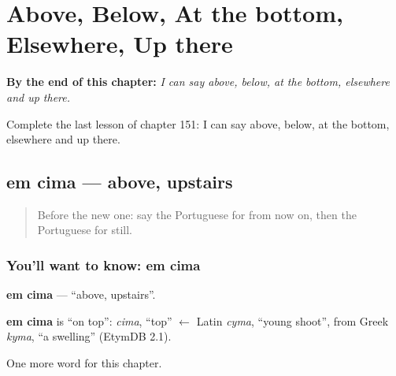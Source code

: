 
\chapter{Above, Below, At the bottom, Elsewhere, Up there}
\label{ch:pt-above-below-at-the-bottom-elsewhere-up-there}

\begin{chapteropening}
\textbf{By the end of this chapter:} \emph{I can say above, below, at the bottom, elsewhere and up there.}

Complete the last lesson of chapter 151: I can say above, below, at the bottom, elsewhere and up there.
\end{chapteropening}

\section[em cima]{em cima — above, upstairs}

\label{lesson:PT-C151-em-cima}



\begin{quote}
Before the new one: say the Portuguese for from now on, then the Portuguese for still.
\end{quote}

\subsection*{You'll want to know: em cima}
\textbf{em cima} — \textquotedblleft{}above, upstairs\textquotedblright{}.

\begin{cousinweb}
\textbf{em cima} is \textquotedblleft{}on top\textquotedblright{}: \emph{cima}, \textquotedblleft{}top\textquotedblright{} $\leftarrow$ Latin \emph{cyma}, \textquotedblleft{}young shoot\textquotedblright{}, from Greek \emph{kyma}, \textquotedblleft{}a swelling\textquotedblright{} (EtymDB 2.1).
\end{cousinweb}

\begin{grammarlens}[title={What you've built}]
One more word for this chapter.
\end{grammarlens}

